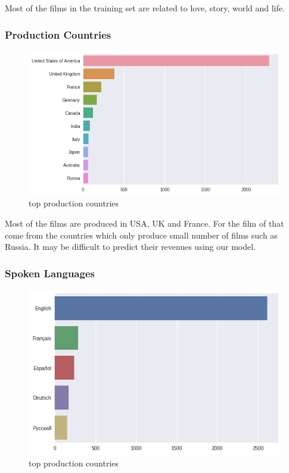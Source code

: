 \documentclass{article}
\begin{document}
Most of the films in the training set are related to love, story, world and life.
\pagebreak

\subsubsection{Production Countries}
\begin{figure}[h]
  \centering
  \includegraphics[scale=0.7]{production_com.png}
  \caption{top production countries}
\end{figure}

Most of the films are produced in USA, UK and France. For the film of that come from the countries which only produce small number of films such as Russia. It may be difficult to predict their revenues using our model.
\pagebreak

\subsubsection{Spoken Languages}
\begin{figure}[h]
  \centering
  \includegraphics[scale=0.7]{lang.png}
  \caption{top production countries}
\end{figure}
\end{document}
